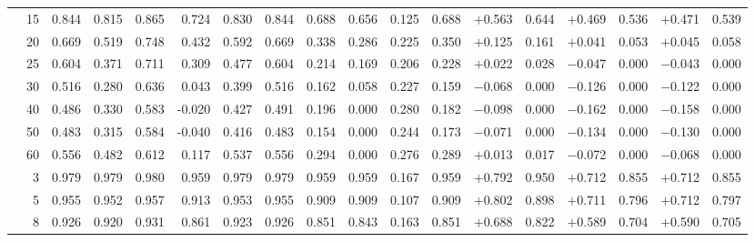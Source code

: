 \documentclass[conference]{IEEEtran}
\theoremstyle{remark}
\begin{document}
\begin{table}[ht]
{\begin{tabular}{p{2.2cm}r rrrr rr rr rr rr rr rr}
  & 15 & 0.844 & 0.815 & 0.865 & 0.724 & 0.830 & 0.844 & 0.688 & 0.656 & 0.125 & 0.688 & $+$0.563 & 0.644 & $+$0.469 & 0.536 & $+$0.471 & 0.539 \\
  & 20 & 0.669 & 0.519 & 0.748 & 0.432 & 0.592 & 0.669 & 0.338 & 0.286 & 0.225 & 0.350 & $+$0.125 & 0.161 & $+$0.041 & 0.053 & $+$0.045 & 0.058 \\
  & 25 & 0.604 & 0.371 & 0.711 & 0.309 & 0.477 & 0.604 & 0.214 & 0.169 & 0.206 & 0.228 & $+$0.022 & 0.028 & $-$0.047 & 0.000 & $-$0.043 & 0.000 \\
  & 30 & 0.516 & 0.280 & 0.636 & 0.043 & 0.399 & 0.516 & 0.162 & 0.058 & 0.227 & 0.159 & $-$0.068 & 0.000 & $-$0.126 & 0.000 & $-$0.122 & 0.000 \\
  & 40 & 0.486 & 0.330 & 0.583 & -0.020 & 0.427 & 0.491 & 0.196 & 0.000 & 0.280 & 0.182 & $-$0.098 & 0.000 & $-$0.162 & 0.000 & $-$0.158 & 0.000 \\
  & 50 & 0.483 & 0.315 & 0.584 & -0.040 & 0.416 & 0.483 & 0.154 & 0.000 & 0.244 & 0.173 & $-$0.071 & 0.000 & $-$0.134 & 0.000 & $-$0.130 & 0.000 \\
  & 60 & 0.556 & 0.482 & 0.612 & 0.117 & 0.537 & 0.556 & 0.294 & 0.000 & 0.276 & 0.289 & $+$0.013 & 0.017 & $-$0.072 & 0.000 & $-$0.068 & 0.000 \\
\midrule
{}
  & 3  & 0.979 & 0.979 & 0.980 & 0.959 & 0.979 & 0.979 & 0.959 & 0.959 & 0.167 & 0.959 & $+$0.792 & 0.950 & $+$0.712 & 0.855 & $+$0.712 & 0.855 \\
  & 5  & 0.955 & 0.952 & 0.957 & 0.913 & 0.953 & 0.955 & 0.909 & 0.909 & 0.107 & 0.909 & $+$0.802 & 0.898 & $+$0.711 & 0.796 & $+$0.712 & 0.797 \\
  & 8  & 0.926 & 0.920 & 0.931 & 0.861 & 0.923 & 0.926 & 0.851 & 0.843 & 0.163 & 0.851 & $+$0.688 & 0.822 & $+$0.589 & 0.704 & $+$0.590 & 0.705 \\

\end{tabular}}
\end{table}
\end{document}

